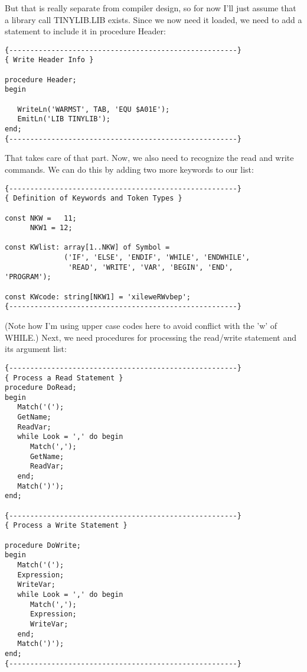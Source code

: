But that is really separate from compiler design, so for now I'll just assume that a library call TINYLIB.LIB exists. Since we now need  it  loaded, we need to add a statement to  include  it  in procedure Header:

\begin{verbatim}
{------------------------------------------------------}
{ Write Header Info }

procedure Header;
begin

   WriteLn('WARMST', TAB, 'EQU $A01E');
   EmitLn('LIB TINYLIB');
end;
{------------------------------------------------------}
\end{verbatim}

That takes care of that part. Now, we also need to recognize the
read  and  write  commands. We can do this by  adding  two  more
keywords to our list:

\begin{verbatim}
{------------------------------------------------------}
{ Definition of Keywords and Token Types }

const NKW =   11;
      NKW1 = 12;

const KWlist: array[1..NKW] of Symbol =
              ('IF', 'ELSE', 'ENDIF', 'WHILE', 'ENDWHILE',
               'READ', 'WRITE', 'VAR', 'BEGIN', 'END',
'PROGRAM');

const KWcode: string[NKW1] = 'xileweRWvbep';
{------------------------------------------------------}
\end{verbatim}

(Note how I'm using upper case codes here to avoid  conflict with the 'w' of WHILE.)
Next, we need procedures for processing the  read/write statement and its argument list:

\begin{verbatim}
{------------------------------------------------------}
{ Process a Read Statement }
procedure DoRead;
begin
   Match('(');
   GetName;
   ReadVar;
   while Look = ',' do begin
      Match(',');
      GetName;
      ReadVar;
   end;
   Match(')');
end;

{------------------------------------------------------}
{ Process a Write Statement }

procedure DoWrite;
begin
   Match('(');
   Expression;
   WriteVar;
   while Look = ',' do begin
      Match(',');
      Expression;
      WriteVar;
   end;
   Match(')');
end;
{------------------------------------------------------}
\end{verbatim}

